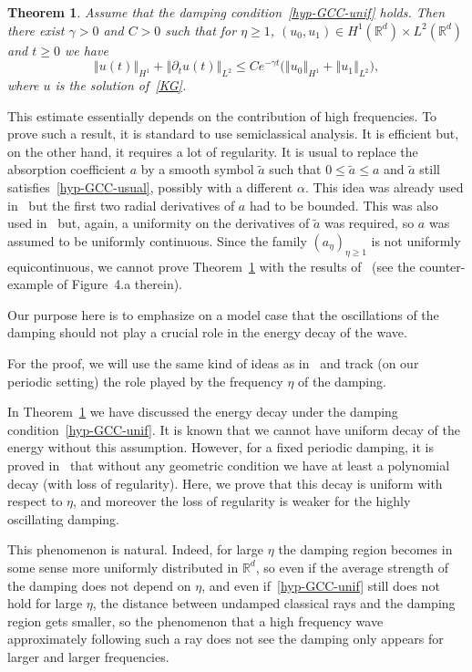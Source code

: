 \documentclass[11pt]{article}
\newtheorem{theo}{Theorem}[section]
\theoremstyle{definition}
\numberwithin{equation}{section}
\numberwithin{figure}{section}
\numberwithin{table}{section}
\newcommand{\nr}[1]{\left\Vert #1\right\Vert}
\renewcommand{\leq}{\leqslant}
\renewcommand{\geq}{\geqslant}
\newcommand{\1}{\mathds 1}
\newcommand{\R}{\mathbb{R}}
\renewcommand{\a}{\alpha}
\newcommand{\g}{\gamma}
\begin{document}
\begin{theo}\label{th-unif-decay}
Assume that the damping condition~\eqref{hyp-GCC-unif} holds. Then there exist $\g > 0$ and $C > 0$ such that for $\eta \geq 1$, $(u_0,u_1) \in H^1(\R^d) \times L^2(\R^d)$ and $t \geq 0$ we have
\[
\nr{u(t)}_{H^1} + \nr{\partial_t u(t)}_{L^2} \leq C e^{-\g t} \big(\nr{u_0}_{H^1} + \nr{u_1}_{L^2} \big),
\]
where $u$ is the solution of~\eqref{KG}.
\end{theo}

This estimate essentially depends on the contribution of high frequencies. To prove such a result, it is standard to use semiclassical analysis. It is efficient but, on the other hand, it requires a lot of regularity. It is usual to replace the absorption coefficient $a$ by a smooth symbol $\tilde a$ such that $0 \leq \tilde a \leq a$ and $\tilde a$ still satisfies~\eqref{hyp-GCC-usual}, possibly with a different $\a$. This idea was already used in~\cite{royer-mourre} but the first two radial derivatives of $a$ had to be bounded. This was also used in~\cite{BurqJo} but, again, a uniformity on the derivatives of $\tilde a$ was required, so $a$ was assumed to be uniformly continuous. Since the family $(a_\eta)_{\eta \geq 1}$ is not uniformly equicontinuous, we cannot prove Theorem~\ref{th-unif-decay} with the results of~\cite{BurqJo} (see the counter-example of Figure~4.a therein).

Our purpose here is to emphasize on a model case that the oscillations of the damping should not play a crucial role in the energy decay of the wave.

For the proof, we will use the same kind of ideas as in~\cite{BurqJo} and track (on our periodic setting) the role played by the frequency $\eta$ of the damping.%


In Theorem~\ref{th-unif-decay} we have discussed the energy decay under the damping condition~\eqref{hyp-GCC-unif}. It is known that we cannot have uniform decay of the energy without this assumption. However, for a fixed periodic damping, it is proved in~\cite{Wunsch} that without any geometric condition we have at least a polynomial decay (with loss of regularity). Here, we prove that this decay is uniform with respect to $\eta$, and moreover the loss of regularity is weaker for the highly oscillating damping.

This phenomenon is natural. Indeed, for large $\eta$ the damping region becomes in some sense more uniformly distributed in $\R^d$, so even if the average strength of the damping does not depend on $\eta$, and even if~\eqref{hyp-GCC-unif} still does not hold for large $\eta$, the distance between undamped classical rays and the damping region gets smaller, so the phenomenon that a high frequency wave approximately following such a ray does not see the damping only appears for larger and larger frequencies.
\end{document}
